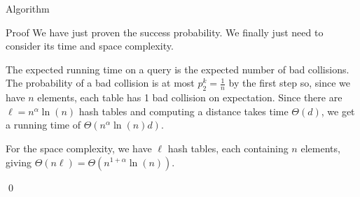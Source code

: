 \documentclass[a4paper]{article}
\begin{document}
\begin{parag}{Algorithm}
\begin{subparag}{Proof}
        We have just proven the success probability. We finally just need to consider its time and space complexity.

        The expected running time on a query is the expected number of bad collisions. The probability of a bad collision is at most $p_2^k = \frac{1}{n}$ by the first step so, since we have $n$ elements, each table has 1 bad collision on expectation. Since there are $\ell = n^{\alpha} \ln\left(n\right)$ hash tables and computing a distance takes time $\Theta\left(d\right)$, we get a running time of $\Theta\left(n^{\alpha} \ln\left(n\right)d\right)$.

        For the space complexity, we have $\ell$ hash tables, each containing $n$ elements, giving $\Theta\left(n \ell\right) = \Theta\left(n^{1 + \alpha} \ln\left(n\right)\right)$.

        \qed
    \end{subparag}
\end{parag}
\end{document}

